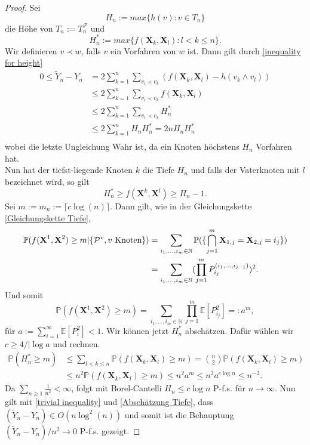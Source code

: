 \begin{proof}
Sei 
\begin{equation}
H_n := max\{h(v) : v \in T_n\}
\end{equation}
die Höhe von $T_n := T_n^\mathcal{P}$ und
\begin{equation}
H^*_n := max\{f(\textbf{X}_k,\textbf{X}_l) : l < k \leq n\}.
\end{equation}
Wir definieren $v \prec w$, falls $v$ ein Vorfahren von $w$ ist. Dann gilt durch \ref{inequality for height}
\begin{align}
    0 \leq \tilde{Y}_n - Y_n &= 2\sum_{k=1}^{n}\sum_{v_l \prec v_k}(f(\textbf{X}_k,\textbf{X}_l)-h(v_k \wedge v_l)) \nonumber\\
    &\leq 2\sum_{k=1}^{n}\sum_{v_l \prec v_k}f(\textbf{X}_k,\textbf{X}_l) \nonumber \\
    &\leq 2\sum_{k=1}^{n}\sum_{v_l \prec v_k}H_n^* \nonumber \\
    &\leq 2\sum_{k=1}^{n}H_nH_n^*  = 2nH_nH_n^* \label{Abschätzung Tiefe}\\
\end{align}
wobei die letzte Ungleichung Wahr ist, da ein Knoten höchstens $H_n$ Vorfahren hat. \\
Nun hat der tiefst-liegende Knoten $k$ die Tiefe $H_n$ und falls der Vaterknoten mit $l$ bezeichnet wird, so gilt 
\begin{equation}
    H^*_n \geq f(\textbf{X}^k,\textbf{X}^l) \geq H_n - 1. \label{trivial inequality}
\end{equation}
Sei $m := m_n := \lceil c \log(n) \rceil$. Dann gilt, wie in der Gleichungskette \ref{Gleichungskette Tiefe},
\begin{align*}
\mathbb{P}(f(\textbf{X}^1,\textbf{X}^2)\geq m| \{\mathcal{P}^v, v \textnormal{ Knoten}\}) &=\sum_{i_1,...,i_m \in \mathbb{N}} \mathbb{P}( \{\bigcap_{j=1}^{m}\textbf{X}_{1,j}=\textbf{X}_{2,j} = i_j \}) \\ 
&=\sum_{i_1,...,i_m \in \mathbb{N}}(\prod_{j=1}^{m}P_{i_j}^{(i_1,...,i_{j-1})}) ^2.
\end{align*}
Und somit
\[
\mathbb{P}(f(\textbf{X}^1,\textbf{X}^2)\geq m) = \sum_{i_1,...,i_m \in \mathbb{N}}\prod_{j=1}^{m}\mathbb{E}[P_{i_j}^2]  =: a^m,
\]
für $a := \sum_{i=1}^{\infty}\mathbb{E}[P_i^2] < 1$. Wir können jetzt $H^*_n$ abschätzen. Dafür wählen wir $c \geq 4 / |\log{a}$ und rechnen.
\begin{align*}
\mathbb{P}(H^*_n \geq m) &\leq \sum_{l < k \leq n} \mathbb{P}(f(\textbf{X}_k,\textbf{X}_l) \geq m) = {n\choose 2}\mathbb{P}(f(\textbf{X}_k,\textbf{X}_l) \geq m)\\
&\leq n^2\mathbb{P}(f(\textbf{X}_k,\textbf{X}_l) \geq m) \leq n^2a^m \leq n^2a^{c \log{n}} \leq n^{-2}.
\end{align*}
Da $\sum_{n \geq 1}\frac{1}{n^2} < \infty$, folgt mit Borel-Cantelli $H_n \leq c \log{n}$ P-f.s. für $n \to \infty$. Nun gilt mit \ref{trivial inequality} und \ref{Abschätzung Tiefe}, dass $(\tilde{Y}_n - Y_n) \in O(n\log^2(n))$ und somit ist die Behauptung $(\tilde{Y}_n-Y_n)/n^2 \rightarrow 0 $ P-f.s. gezeigt. 
\end{proof}
